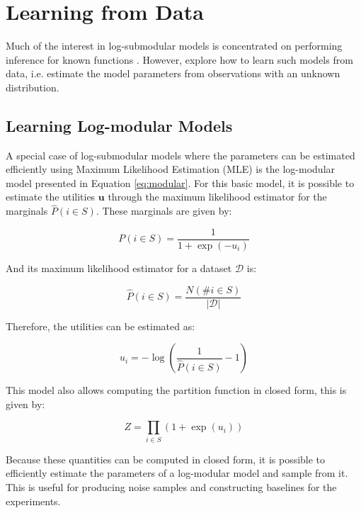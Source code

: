 \section{Learning from Data}
\label{sec:learning}

Much of the interest in log-submodular models is concentrated on performing inference for known functions \citep{tschiatschek16learning}. However, \citet{tschiatschek16learning} explore how to learn such models from data, i.e. estimate the model parameters from observations with an unknown distribution.

\subsection{Learning Log-modular Models}
\label{sec:learning_modular}

A special case of log-submodular models where the parameters can be estimated efficiently using Maximum Likelihood Estimation (MLE) is the log-modular model presented in Equation \eqref{eq:modular}. For this basic model, it is possible to estimate the utilities $\mathbf{u}$ through the maximum likelihood estimator for the marginals $\hat{P}(i \in S)$. These marginals are given by:

\begin{equation}
P(i \in S) = \frac{1}{1 + \exp(-u_{i})}
\end{equation}

And its maximum likelihood estimator for a dataset $\mathcal{D}$ is:

\begin{equation}
\hat{P}(i \in S) = \frac{N(\#i \in S)}{|\mathcal{D}|}
\end{equation}

Therefore, the utilities can be estimated as:

\begin{equation}
\label{eq:modular-mle}
u_{i} = -\log{\left(\frac{1}{\hat{P}(i \in S)} - 1\right)}
\end{equation}

This model also allows computing the partition function in closed form, this is given by:

\begin{equation}
\label{eq:modular-z}
Z = \prod_{i \in S}(1 + \exp(u_{i}))
\end{equation}

Because these quantities can be computed in closed form, it is possible to efficiently estimate the parameters of a log-modular model and sample from it. This is useful for producing noise samples and constructing baselines for the experiments.

